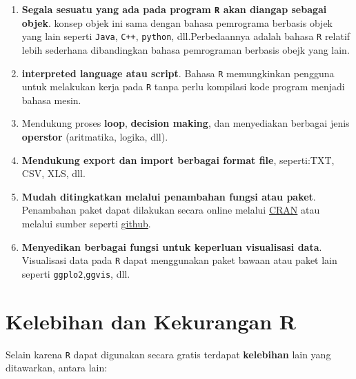 \documentclass[]{book}
\providecommand{\tightlist}{%
  \setlength{\itemsep}{0pt}\setlength{\parskip}{0pt}}
\begin{document}
\begin{enumerate}
\def\labelenumi{\arabic{enumi}.}
\setcounter{enumi}{1}
\tightlist
\item
  \textbf{Segala sesuatu yang ada pada program \texttt{R} akan diangap
  sebagai objek}. konsep objek ini sama dengan bahasa pemrograma
  berbasis objek yang lain seperti \texttt{Java}, \texttt{C++},
  \texttt{python}, dll.Perbedaannya adalah bahasa \texttt{R} relatif
  lebih sederhana dibandingkan bahasa pemrograman berbasis obejk yang
  lain.
\item
  \textbf{interpreted language atau script}. Bahasa \texttt{R}
  memungkinkan pengguna untuk melakukan kerja pada \texttt{R} tanpa
  perlu kompilasi kode program menjadi bahasa mesin.
\item
  Mendukung proses \textbf{loop}, \textbf{decision making}, dan
  menyediakan berbagai jenis \textbf{operstor} (aritmatika, logika,
  dll).
\item
  \textbf{Mendukung export dan import berbagai format file},
  seperti:TXT, CSV, XLS, dll.
\item
  \textbf{Mudah ditingkatkan melalui penambahan fungsi atau paket}.
  Penambahan paket dapat dilakukan secara online melalui
  \href{https://cran.r-project.org/}{CRAN} atau melalui sumber seperti
  \href{https://github.com/}{github}.
\item
  \textbf{Menyedikan berbagai fungsi untuk keperluan visualisasi data}.
  Visualisasi data pada \texttt{R} dapat menggunakan paket bawaan atau
  paket lain seperti \texttt{ggplo2},\texttt{ggvis}, dll.
\end{enumerate}

\section{Kelebihan dan Kekurangan R}\label{kelebihan-dan-kekurangan-r}

Selain karena \texttt{R} dapat digunakan secara gratis terdapat
\textbf{kelebihan} lain yang ditawarkan, antara lain:
\end{document}
